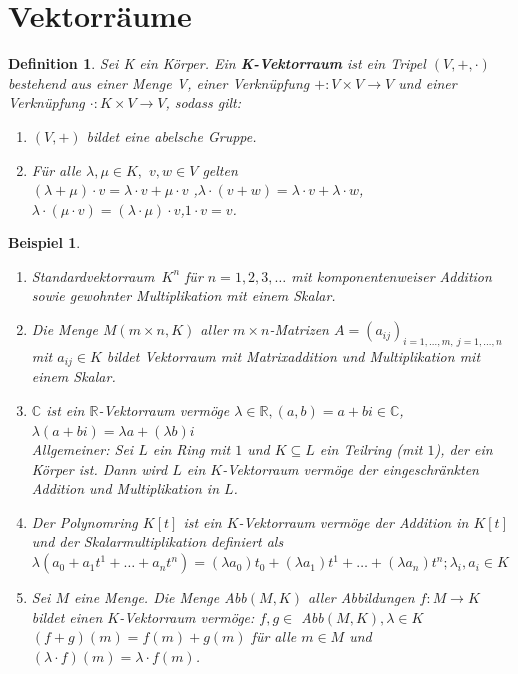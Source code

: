 \documentclass[12pt,a4paper]{article}
\theoremstyle{plain}
\newtheorem{Definition}[Theorem]{Definition}
\newtheorem{Beispiel}[Theorem]{Beispiel}
\newcommand{\herv}[1]{{\emph{\textbf{#1}}}}
\newcommand{\R}{\mathbb{R}}
\newcommand{\C}{\mathbb{C}}
\numberwithin{equation}{section}
\begin{document}
\section{Vektorräume}
\begin{Definition}
Sei K ein Körper. Ein \herv{K-Vektorraum} ist ein Tripel $(V,+,\cdot)$ bestehend aus einer Menge V, einer Verknüpfung $+:V\times V \rightarrow V$ und einer Verknüpfung $\cdot : K\times V \rightarrow V$, sodass gilt:
\begin{enumerate}
\renewcommand{\labelenumi}{\emph{\underline{V\arabic{enumi}}}}
\item $(V,+)$ bildet eine abelsche Gruppe.
\item Für alle $\lambda, \mu \in K,$  $ v,w\in V$ gelten \\
$(\lambda+\mu)\cdot v=\lambda \cdot v+ \mu\cdot v$ ,\quad $\lambda\cdot (v+w)=\lambda\cdot v+ \lambda \cdot w$,\quad $\lambda\cdot (\mu\cdot v)=(\lambda\cdot\mu)\cdot v$,\quad $1\cdot v=v$.
\end{enumerate}
\end{Definition}
\begin{Beispiel}\mbox{ }
\begin{enumerate}
\renewcommand{\labelenumi}{\alph{enumi})}
\item \glqq Standardvektorraum\grqq\ $K^n$ für $n=1,2,3,\ldots$ mit komponentenweiser Addition sowie gewohnter Multiplikation mit einem Skalar.
\item Die Menge $M(m\times n,K)$ aller $m\times n$-Matrizen $A=(a_{ij})_{i=1,\ldots,m,\ j=1,\ldots,n}$ mit $a_{ij}\in K$ bildet Vektorraum mit Matrixaddition und Multiplikation mit einem Skalar.
\item $\C$ ist ein $\R$-Vektorraum vermöge $\lambda\in\R, (a,b)=a+bi\in\C$, $\lambda(a+bi)=\lambda a+(\lambda b) i$\\
Allgemeiner: Sei $L$ ein Ring mit $1$ und $K\subseteq L$ ein Teilring (mit $1$), der ein Körper ist. Dann wird $L$ ein $K$-Vektorraum vermöge der eingeschränkten Addition und Multiplikation in $L$.
\item Der Polynomring $K[t]$ ist ein $K$-Vektorraum vermöge der Addition in $K[t]$ und der Skalarmultiplikation definiert als $\lambda(a_0+a_1t^1+\ldots+a_nt^n)=(\lambda a_0)t_0+(\lambda a_1)t^1+\ldots+(\lambda a_n)t^n; \lambda_i,a_i \in K$
\item  Sei $M$ eine Menge. Die Menge Abb$(M,K)$ aller Abbildungen $f:M\rightarrow K$ bildet einen $K$-Vektorraum vermöge: $f,g\in$ Abb$(M,K),\lambda\in K$ $(f+g)(m)=f(m)+g(m)$ für alle $m\in M$ und $(\lambda\cdot f)(m)=\lambda\cdot f(m)$.
\end{enumerate}
\end{Beispiel}
\end{document}
